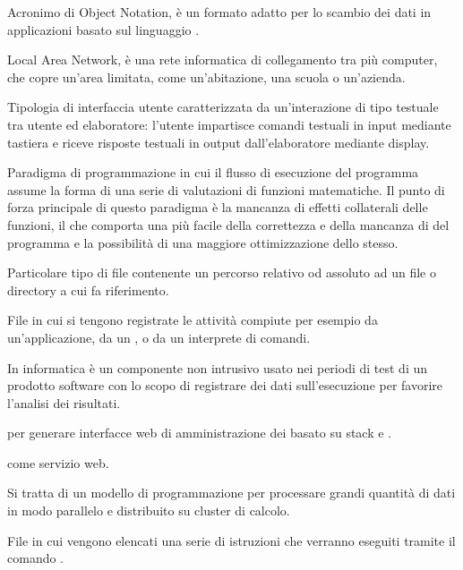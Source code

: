 Acronimo di  Object Notation, è un formato adatto per lo scambio dei dati in applicazioni  basato sul linguaggio .


Local Area Network, è una rete informatica di collegamento tra più computer, che copre un'area limitata, come un'abitazione, una scuola o un'azienda.

Tipologia di interfaccia utente caratterizzata da un'interazione di tipo testuale tra utente ed elaboratore: l'utente impartisce comandi testuali in input mediante tastiera e riceve risposte testuali in output dall'elaboratore mediante display.

Paradigma di programmazione in cui il flusso di esecuzione del programma assume la forma di una serie di valutazioni di funzioni matematiche. Il punto di forza principale di questo paradigma è la mancanza di effetti collaterali delle funzioni, il che comporta una più facile  della correttezza e della mancanza di  del programma e la possibilità di una maggiore ottimizzazione dello stesso.

Particolare tipo di file contenente un percorso relativo od assoluto ad un file o directory a cui fa riferimento.

File in cui si tengono registrate le attività compiute per esempio da un'applicazione, da un , o da un interprete di comandi.

In informatica è un componente non intrusivo usato nei periodi di test di un prodotto software con lo scopo di registrare dei dati sull'esecuzione per favorire l'analisi dei risultati.


 per generare interfacce web di amministrazione dei  basato su stack  e .

\ProjectName{} come servizio web.

Si tratta di un modello di programmazione per processare grandi quantità di dati in modo parallelo e distribuito su cluster di calcolo.

File in cui vengono elencati una serie di istruzioni che verranno eseguiti tramite il comando .

